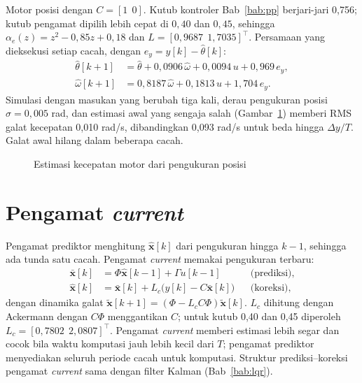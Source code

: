 \begin{contoh}
	Motor posisi dengan $C = [1\ \ 0]$. Kutub kontroler Bab~\ref{bab:pp} berjari-jari 0,756; kutub pengamat dipilih lebih cepat di $0{,}40$ dan $0{,}45$, sehingga $\alpha_e(z) = z^2 - 0{,}85z + 0{,}18$ dan $L = [0{,}9687\ \ 1{,}7035]^\top$. Persamaan yang dieksekusi setiap cacah, dengan $e_y = y[k] - \hat\theta[k]$:
	\begin{align*}
		\hat\theta[k+1] &= \hat\theta + 0{,}0906\,\hat\omega + 0{,}0094\,u + 0{,}969\,e_y,\\
		\hat\omega[k+1] &= 0{,}8187\,\hat\omega + 0{,}1813\,u + 1{,}704\,e_y.
	\end{align*}
	Simulasi dengan masukan yang berubah tiga kali, derau pengukuran posisi $\sigma = 0{,}005$ rad, dan estimasi awal yang sengaja salah (Gambar~\ref{fig:b12-obs}) memberi RMS galat kecepatan 0,010 rad/s, dibandingkan 0,093 rad/s untuk beda hingga $\Delta y/T$. Galat awal hilang dalam beberapa cacah.
\end{contoh}

\begin{figure}[H]
	\centering
	\caption{Estimasi kecepatan motor dari pengukuran posisi}
	\label{fig:b12-obs}
\end{figure}

\section{Pengamat \textit{current}}
Pengamat prediktor menghitung $\hat{\mathbf{x}}[k]$ dari pengukuran hingga $k-1$, sehingga ada tunda satu cacah. Pengamat \textit{current} memakai pengukuran terbaru:
\begin{align}
	\bar{\mathbf{x}}[k] &= \Phi\hat{\mathbf{x}}[k-1] + \Gamma u[k-1] && \text{(prediksi)},\\
	\hat{\mathbf{x}}[k] &= \bar{\mathbf{x}}[k] + L_c\big(y[k] - C\bar{\mathbf{x}}[k]\big) && \text{(koreksi)},
\end{align}
dengan dinamika galat $\tilde{\mathbf{x}}[k+1] = (\Phi - L_cC\Phi)\tilde{\mathbf{x}}[k]$. $L_c$ dihitung dengan Ackermann dengan $C\Phi$ menggantikan $C$; untuk kutub 0,40 dan 0,45 diperoleh $L_c = [0{,}7802\ \ 2{,}0807]^\top$. Pengamat \textit{current} memberi estimasi lebih segar dan cocok bila waktu komputasi jauh lebih kecil dari $T$; pengamat prediktor menyediakan seluruh periode cacah untuk komputasi. Struktur prediksi--koreksi pengamat \textit{current} sama dengan filter Kalman (Bab~\ref{bab:lqr}).

